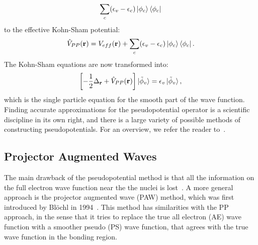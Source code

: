 \begin{refsection}
\begin{equation*}
\sum_c (\epsilon_v - \epsilon_c) \ket{\phi_c} \bra{\phi_c} 
\end{equation*} 
to the effective Kohn-Sham potential: 
\begin{equation} 
\hat{V}_{PP}(\mathbf{r}) = V_{eff}(\mathbf{r}) + \sum_c (\epsilon_v - 
\epsilon_c) \ket{\phi_c} \bra{\phi_c}. 
\end{equation} 
The Kohn-Sham equations are now transformed into: 
\begin{equation} 
\left[- \frac{1}{2} \Delta_{\mathbf{r}} + \hat{V}_{PP}(\mathbf{r}) 
\right]\ket{\tilde{\phi}_v} = \epsilon_v \ket{\tilde{\phi}_v}, 
\end{equation} 
which is the single particle equation for the smooth part of the wave 
function. Finding accurate approximations for the pseudopotential operator is 
a scientific discipline in its own right, and there is a large variety of 
possible methods of constructing pseudopotentials. For an overview, we refer 
the reader to~\cite{Singh2006}. 
 
\subsection{Projector Augmented Waves} \label{dft:sec-PAW} 
 
The main drawback of the pseudopotential method is that all the information on 
the full electron wave function near the the nuclei is 
lost~\cite{Rostgaard2009}. A more general approach is the projector augmented 
wave (PAW) method, which was first introduced by Bl\"ochl in 
1994~\cite{Blochl1994}. This method has similarities with the PP approach, in 
the sense that it tries to replace the true all electron (AE) wave function 
with a smoother pseudo (PS) wave function, that agrees with the true wave 
function in the bonding region. 
 

\end{refsection}
